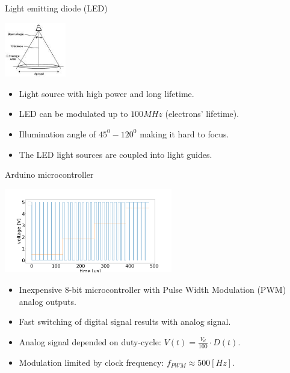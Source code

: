 \documentclass{beamer}
\begin{document}
\begin{frame}{Light emitting diode (LED)}
	\begin{center}		
		\includegraphics[width=0.2\textwidth,keepaspectratio]{FOV.jpg}
	\end{center}
	\begin{itemize}		
		\item Light source with high power and long lifetime.
		\item LED can be modulated up to $100MHz$ (electrons' lifetime).
		\item Illumination angle of $45^0-120^0$ making it hard to focus.
		\item The LED light sources are coupled into light guides.
	\end{itemize}
\end{frame}

\begin{frame}{Arduino microcontroller}
	\begin{center}		
		\includegraphics[width=0.55\textwidth,keepaspectratio]{duty_cycle.png}
	\end{center}
	\begin{itemize}		
		\item Inexpensive 8-bit microcontroller with Pulse Width Modulation (PWM) analog outputs.
		\item Fast switching of digital signal results with analog signal.
		\item Analog signal depended on duty-cycle: $V(t) =  \frac{V_d}{100}\cdot D(t)$.
		\item Modulation limited by clock frequency: $f_{PWM} \approx 500[Hz]$.
	\end{itemize}
\end{frame}
\end{document}
